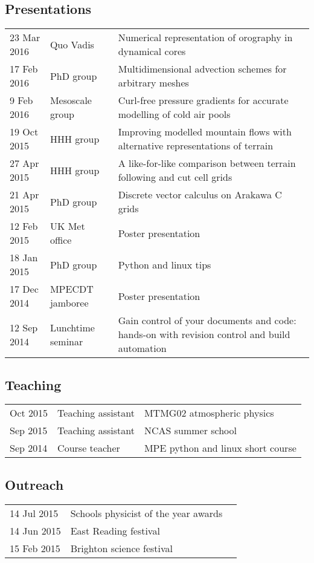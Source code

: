 \documentclass[a4paper,11pt]{article}
\begin{document}
\subsection*{Presentations}
\begin{tabularx}{\linewidth}{l l X}
23 Mar 2016 & Quo Vadis & Numerical representation of orography in dynamical cores \\
17 Feb 2016 & PhD group & Multidimensional advection schemes for arbitrary meshes \\
9 Feb 2016 & Mesoscale group & Curl-free pressure gradients for accurate modelling of cold air pools \\
19 Oct 2015 & HHH group & Improving modelled mountain flows with alternative representations of terrain \\
27 Apr 2015 & HHH group & A like-for-like comparison between terrain following and cut cell grids \\
21 Apr 2015 & PhD group & Discrete vector calculus on Arakawa C grids \\
12 Feb 2015 & UK Met office & Poster presentation \\
18 Jan 2015 & PhD group & Python and linux tips \\
17 Dec 2014 & MPECDT jamboree & Poster presentation \\
12 Sep 2014 & Lunchtime seminar  & Gain control of your documents and code: hands-on with revision control and build automation \\
\end{tabularx}

\subsection*{Teaching}
\begin{tabular}{l l l}
Oct 2015 & Teaching assistant & MTMG02 atmospheric physics \\
Sep 2015 & Teaching assistant & NCAS summer school \\
Sep 2014 & Course teacher & MPE python and linux short course \\
\end{tabular}

\subsection*{Outreach}
\begin{tabular}{l l l}
14 Jul 2015 & Schools physicist of the year awards \\
14 Jun 2015 & East Reading festival \\
15 Feb 2015 & Brighton science festival \\
\end{tabular}
\end{document}
